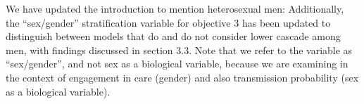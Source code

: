\begin{comment}\label{hm.gaps}
The third paragraph of the Introduction mentions possible inequalities in uptake of HIV testing and ART as an explanation for the lower-than-expected impact of UTT, and mentions a number of sub-populations that might be disadvantaged. But the authors fail to mention heterosexual men. There is much evidence of heterosexual men being at a disadvantage (in terms of HIV testing and ART uptake) and they also contribute more to transmission than heterosexual women, so why are they not mentioned here? Similarly in the second and third paragraphs of the discussion the authors criticize modelling studies that don't consider key population dynamics, but they don't mention the challenges around engaging heterosexual men (and the problem that many models don't consider differences between men and women in ART coverage). The poor uptake of HIV testing and ART in heterosexual men is really the Achilles heel in the 'treatment as prevention' strategy in Africa, yet this issue is frequently ignored in the literature. I feel the authors could have drawn more attention to this issue throughout the paper, rather than focusing narrowly on the traditionally defined key populations.
\end{comment}
\begin{response}
We have updated the introduction to mention heterosexual men:
Additionally, the ``sex/gender'' stratification variable for objective 3
has been updated to distinguish between models that do and do not consider lower cascade among men,
with findings discussed in section 3.3.
Note that we refer to the variable as ``sex/gender'', and not sex as a biological variable,
because we are examining in the context of engagement in care (gender)
and also transmission probability (sex as a biological variable).
\end{response}
\begin{comment}
It was not clear why the authors excluded individual-based approaches from this review. Although people tend to use the terms 'compartmental models' and 'deterministic models' interchangeably, some would argue the terms mean slightly different things (see Garnett, STIs, 2002, 78:7-12). The point is that it's possible for an individual-based model to be 'compartmental' in the sense that it works with categorical variables rather than continuously-defined variables. In such cases one could argue for including an individual-based model in the review, since its compartments/categories can be classified in the same way as a deterministic model. But even when key variables are defined on a continuous scale it's not clear why you would want to exclude the individual-based model from the review.
\end{comment}
